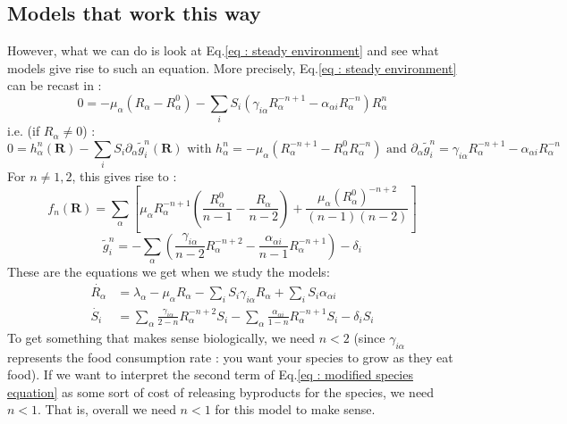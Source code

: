 \documentclass[12pt]{article}
\newcommand{\vect}[1]{\textbf{#1}}
\begin{document}
\begin{appendices}
		\subsection{Models that work this way}
		However, what we can do is look at Eq.\eqref{eq : steady environment} and see what models give rise to such an equation.
		More precisely, Eq.\eqref{eq : steady environment} can be recast in :
		\begin{equation}
			0 = - \mu_\alpha (R_\alpha-R_\alpha^0) - \sum_i S_i  \left(\gamma_{i\alpha} R_\alpha^{-n+1}-\alpha_{\alpha i} R_\alpha^{-n} \right)R_\alpha^n
		\end{equation}
		i.e. (if $R_\alpha \neq 0$) :
		\begin{equation}
			0 = h_\alpha^n(\vect{R})-\sum_i S_i \partial_\alpha \tilde{g}^n_i(\vect{R}) \text{ with } h^n_\alpha =  -\mu_\alpha\left(R_\alpha^{-n+1}-R_\alpha^0 R_\alpha^{-n}\right) \text{ and } \partial_\alpha \tilde{g}^n_i = \gamma_{i \alpha}R_\alpha^{-n+1}-\alpha_{\alpha i}R_\alpha^{-n}
		\end{equation}
		For $n \neq 1, 2$, this gives rise to :
		\begin{equation}
			f_n(\vect{R}) = \sum_\alpha \left[\mu_\alpha R_\alpha^{-n+1} \left(\frac{R_\alpha^0}{n-1}-\frac{R_\alpha}{n-2}\right)+\frac{\mu_\alpha (R_\alpha^0)^{-n+2}}{(n-1)(n-2)}\right] 
		\end{equation}
		\begin{equation}
			\tilde{g}_i^n = -\sum_\alpha\left(\frac{\gamma_{i\alpha}}{n-2} R_\alpha^{-n+2}-\frac{\alpha_{\alpha i}}{n-1}R_\alpha^{-n+1}\right)-\delta_i
		\end{equation}
		These are the equations we get when we study the models:
		\begin{align}
			\dot{R_\alpha} &= \lambda_\alpha - \mu_\alpha R_\alpha - \sum_i S_i \gamma_{i\alpha}R_\alpha + \sum_i S_i \alpha_{\alpha i} \\
			\dot{S_i}  &=  \sum_\alpha\frac{\gamma_{i\alpha}}{2-n} R_\alpha^{-n+2}S_i-\sum_{\alpha}\frac{\alpha_{\alpha i}}{1-n}R_\alpha^{-n+1}S_i-\delta_iS_i \label{eq : modified species equation}
		\end{align}
		To get something that makes sense biologically, we need $n < 2$ (since $\gamma_{i\alpha}$ represents the food consumption rate : you want your species to grow as they eat food). If we want to interpret the second term of Eq.\eqref{eq : modified species equation} as some sort of cost of releasing byproducts for the species, we need $n<1$. That is, overall we need $n<1$ for this model to make sense.


\end{appendices}
\end{document}
